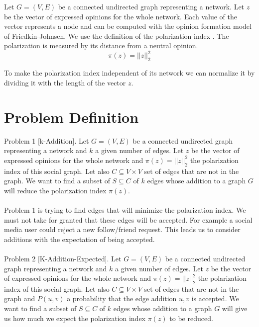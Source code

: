 \noindent Let $G = (V,E)$ be a connected undirected graph representing a network. Let $z$ be the vector of expressed opinions  for the whole network. Each value  of the vector represents a node and can be computed with the opinion formation model of Friedkin-Johnsen. We use the definition of the polarization index \cite{tsapMatakosTerzi}. The polarization is measured by its distance from a neutral opinion.
\vspace{20pt}
\begin{equation}
	\pi(z) = ||z||_{2}^2
\end{equation}
\vspace{20pt}

\noindent To make the polarization index independent of its network we can normalize it by dividing it with the length of the vector $z$. 
\clearpage

\section{Problem Definition}
\label{sec:problemDef}

\noindent Problem 1 [k-Addition]. \noindent Let $G = (V,E)$ be a connected undirected graph representing a network and $k$ a given number of edges. Let $z$ be the vector of expressed opinions  for the whole network and $\pi(z) = ||z||_{2}^2$ the polarization index of this social graph. Let also $C \subseteq	V \times V$ set of edges that are not in the graph. We want to find a subset of $S \subseteq C$ of $k$ edges whose addition to a graph $G$ will reduce the polarization index $\pi(z)$.
\\
\\
\noindent Problem 1 is trying to find edges that will minimize the polarization index. We must not take for granted that these edges will be accepted. 
For example a social media user could reject a new follow/friend request. This leads us to consider additions with the expectation of being accepted. 
\\
\\
\noindent Problem 2 [K-Addition-Expected]. Let $G = (V,E)$ be a connected undirected graph representing a network and $k$ a given number of edges. Let $z$ be the vector of expressed opinions  for the whole network and $\pi(z) = ||z||_{2}^2$ the polarization index of this social graph. Let also $C \subseteq V \times V$ set of edges that are not in the graph and $P(u,v)$ a probability that the edge addition $u,v$ is accepted. We want to find a subset of $S \subseteq C$ of $k$ edges whose addition to a graph $G$ will give us how much we expect the polarization index $\pi(z)$ to be reduced.



